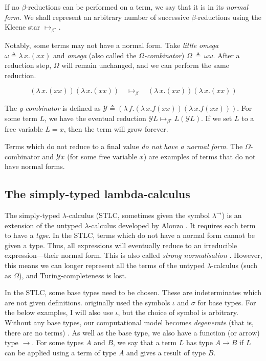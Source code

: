 If no $\beta$-reductions can be performed on a term, we say that it is in its \textit{normal form}.
We shall represent an arbitrary number of successive $\beta$-reductions using the Kleene star
$\mapsto_{\beta^{\star}}$.

Notably, some terms may not have a normal form. Take \textit{little omega} $\omega \triangleq
\lambda \, x. (x x)$ and \textit{omega} (also called the $\Omega$\textit{-combinator}) $\Omega \,
\triangleq \, \omega \omega$. After a reduction step, $\Omega$ will remain unchanged, and we can
perform the same reduction.

\begin{equation*}
  (\lambda \, x. (x x)) (\lambda \, x. (x x)) \quad
  \mapsto_{\beta} \quad (\lambda \, x. (x x)) (\lambda \, x. (x x))
\end{equation*}

The \textit{y-combinator} is defined as $\mathcal{Y} \triangleq (\lambda \, f. (\lambda \, x. f (x x
)) (\lambda \, x. f (xx)))$. For some term $L$, we have the eventual reduction $\mathcal{Y} L
\mapsto_{\beta^{\star}} L (\mathcal{Y} L)$. If we set $L$ to a free variable $L = x$, then the term
will grow forever.

Terms which do not reduce to a final value \textit{do not have a normal form}. The $\Omega$-
combinator and $\mathcal{Y} x$ (for some free variable $x$) are examples of terms that do not have
normal forms.

\subsection{The simply-typed lambda-calculus}
The simply-typed $\lambda$-calculus (STLC, sometimes given the symbol $\lambda^{\rightarrow}$) is an
extension of the untyped $\lambda$-calculus developed by Alonzo \citet{church_formulation_1940}. It
requires each term to have a \textit{type}. In the STLC, terms which do not have a normal form
cannot be given a type. Thus, all expressions will eventually reduce to an irreducible
expression---their normal form. This is also called \textit{strong normalisation}
\citep{pierce_types_2002}. However, this means we can longer represent all the terms of the untyped
$\lambda$-calculus (such as $\Omega$), and Turing-completeness is lost.

In the STLC, some base types need to be chosen. These are indeterminates which are not given
definitions. \citet{church_formulation_1940} originally used the symbols $\iota$ and $\sigma$ for
base types. For the below examples, I will also use $\iota$, but the choice of symbol is arbitrary.
Without any base types, our computational model becomes \textit{degenerate} (that is, there are no
terms) \citep{pierce_types_2002}. As well as the base type, we also have a function (or arrow) type
$\to$. For some types $A$ and $B$, we say that a term $L$ has type $A \to B$ if $L$ can be applied
using a term of type $A$ and gives a result of type $B$.

